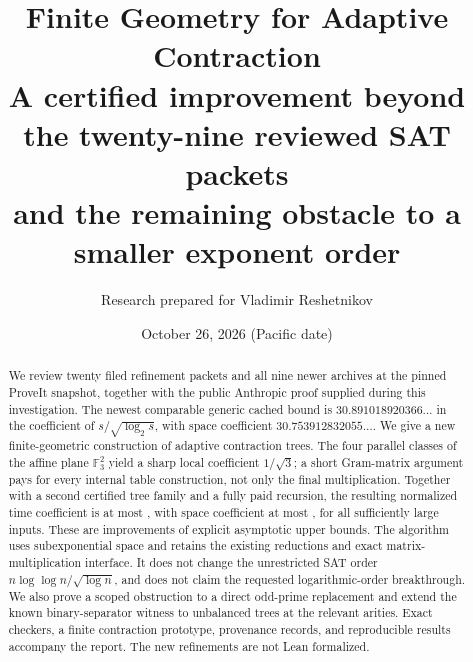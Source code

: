 \documentclass[11pt,letterpaper]{article}
\title{\textbf{Finite Geometry for Adaptive Contraction}\\[5pt]
\large A certified improvement beyond the twenty-nine reviewed SAT packets\\
and the remaining obstacle to a smaller exponent order}
\author{Research prepared for Vladimir Reshetnikov}
\date{October 26, 2026 (Pacific date)}
\theoremstyle{definition}\newtheorem{definition}[theorem]{Definition}
\theoremstyle{remark}\newtheorem{remark}[theorem]{Remark}
\newcommand{\F}{\mathbb F}
\begin{document}
\maketitle
\begin{abstract}
We review twenty filed refinement packets and all nine newer archives at
the pinned ProveIt snapshot, together with the public Anthropic proof supplied
during this investigation. The newest comparable generic cached bound is
$30.891018920366\ldots$ in the coefficient of $s/\sqrt{\log_2 s}$,
with space coefficient $30.753912832055\ldots$.
We give a new finite-geometric construction of adaptive contraction trees.
The four parallel classes of the affine plane $\F_3^2$ yield a sharp local
coefficient $1/\sqrt3$; a short Gram-matrix argument pays for every internal
table construction, not only the final multiplication. Together with a
second certified tree family and a fully paid recursion, the resulting
normalized time coefficient is at most \NewTimeBound, with space coefficient
at most \NewSpaceBound, for all sufficiently large inputs.
These are improvements of explicit asymptotic upper bounds. The algorithm
uses subexponential space and retains the existing reductions and exact
matrix-multiplication interface. It does not change the unrestricted SAT
order $n\log\log n/\sqrt{\log n}$, and does not claim the requested
logarithmic-order breakthrough. We also prove a scoped obstruction to a
direct odd-prime replacement and extend the known binary-separator witness
to unbalanced trees at the relevant arities. Exact checkers, a finite
contraction prototype, provenance records, and reproducible results accompany
the report. The new refinements are not Lean formalized.
\end{abstract}
\clearpage
\setcounter{tocdepth}{2}
\tableofcontents
\newpage








\end{document}
